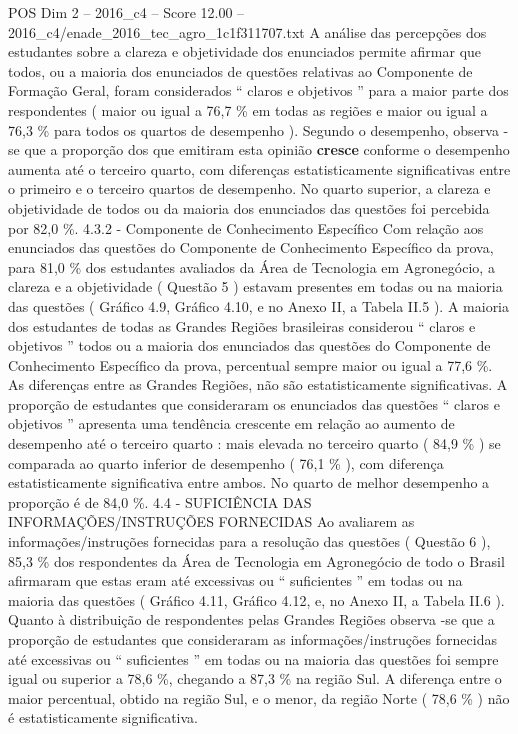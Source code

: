 \begin{textsample}{POS Dim 2 – 2016\_c4 – Score 12.00 – 2016\_c4/enade\_2016\_tec\_agro\_1c1f311707.txt}
A análise das percepções dos estudantes sobre a clareza e objetividade dos enunciados permite afirmar que todos, ou a maioria dos enunciados de questões relativas ao Componente de Formação Geral, foram considerados “ claros e objetivos ” para a maior parte dos respondentes ( maior ou igual a 76,7 \% em todas as regiões e maior ou igual a 76,3 \% para todos os quartos de desempenho ).
Segundo o desempenho, observa -se que a proporção dos que emitiram esta opinião \textbf{cresce} conforme o desempenho aumenta até o terceiro quarto, com diferenças estatisticamente significativas entre o primeiro e o terceiro quartos de desempenho.
No quarto superior, a clareza e objetividade de todos ou da maioria dos enunciados das questões foi percebida por 82,0 \%. 4.3.2 - Componente de Conhecimento Específico Com relação aos enunciados das questões do Componente de Conhecimento Específico da prova, para 81,0 \% dos estudantes avaliados da Área de Tecnologia em Agronegócio, a clareza e a objetividade ( Questão 5 ) estavam presentes em todas ou na maioria das questões ( Gráfico 4.9, Gráfico 4.10, e no Anexo II, a Tabela II.5 ).
A maioria dos estudantes de todas as Grandes Regiões brasileiras considerou “ claros e objetivos ” todos ou a maioria dos enunciados das questões do Componente de Conhecimento Específico da prova, percentual sempre maior ou igual a 77,6 \%.
As diferenças entre as Grandes Regiões, não são estatisticamente significativas.
A proporção de estudantes que consideraram os enunciados das questões “ claros e objetivos ” apresenta uma tendência crescente em relação ao aumento de desempenho até o terceiro quarto : mais elevada no terceiro quarto ( 84,9 \% ) se comparada ao quarto inferior de desempenho ( 76,1 \% ), com diferença estatisticamente significativa entre ambos.
No quarto de melhor desempenho a proporção é de 84,0 \%. 4.4 - SUFICIÊNCIA DAS INFORMAÇÕES/INSTRUÇÕES FORNECIDAS Ao avaliarem as informações/instruções fornecidas para a resolução das questões ( Questão 6 ), 85,3 \% dos respondentes da Área de Tecnologia em Agronegócio de todo o Brasil afirmaram que estas eram até excessivas ou “ suficientes ” em todas ou na maioria das questões ( Gráfico 4.11, Gráfico 4.12, e, no Anexo II, a Tabela II.6 ).
Quanto à distribuição de respondentes pelas Grandes Regiões observa -se que a proporção de estudantes que consideraram as informações/instruções fornecidas até excessivas ou “ suficientes ” em todas ou na maioria das questões foi sempre igual ou superior a 78,6 \%, chegando a 87,3 \% na região Sul.
A diferença entre o maior percentual, obtido na região Sul, e o menor, da região Norte ( 78,6 \% ) não é estatisticamente significativa.

\end{textsample}
